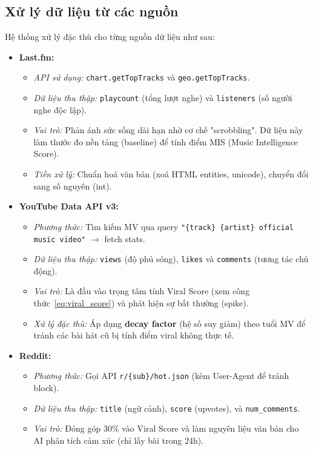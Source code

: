 \documentclass[12pt,a4paper]{report}
\begin{document}
\subsection{Xử lý dữ liệu từ các nguồn}

Hệ thống xử lý đặc thù cho từng nguồn dữ liệu như sau:

\begin{itemize}[leftmargin=*]
    \item \textbf{Last.fm:}
    \begin{itemize}
        \item \textit{API sử dụng:} \texttt{chart.getTopTracks} và \texttt{geo.getTopTracks}.
        \item \textit{Dữ liệu thu thập:} \texttt{playcount} (tổng lượt nghe) và \texttt{listeners} (số người nghe độc lập).
        \item \textit{Vai trò:} Phản ánh sức sống dài hạn nhờ cơ chế "scrobbling". Dữ liệu này làm thước đo nền tảng (baseline) để tính điểm MIS (Music Intelligence Score).
        \item \textit{Tiền xử lý:} Chuẩn hoá văn bản (xoá HTML entities, unicode), chuyển đổi sang số nguyên (int).
    \end{itemize}

    \item \textbf{YouTube Data API v3:}
    \begin{itemize}
        \item \textit{Phương thức:} Tìm kiếm MV qua query \texttt{"\{track\} \{artist\} official music video"} $\rightarrow$ fetch stats.
        \item \textit{Dữ liệu thu thập:} \texttt{views} (độ phủ sóng), \texttt{likes} và \texttt{comments} (tương tác chủ động).
        \item \textit{Vai trò:} Là đầu vào trọng tâm tính Viral Score (xem công thức~\eqref{eq:viral_score}) và phát hiện sự bất thường (spike).
        \item \textit{Xử lý đặc thù:} Áp dụng \textbf{decay factor} (hệ số suy giảm) theo tuổi MV để tránh các bài hát cũ bị tính điểm viral không thực tế.
    \end{itemize}

    \item \textbf{Reddit:}
    \begin{itemize}
        \item \textit{Phương thức:} Gọi API \texttt{r/\{sub\}/hot.json} (kèm User-Agent để tránh block).
        \item \textit{Dữ liệu thu thập:} \texttt{title} (ngữ cảnh), \texttt{score} (upvotes), và \texttt{num\_comments}.
        \item \textit{Vai trò:} Đóng góp 30\% vào Viral Score và làm nguyên liệu văn bản cho AI phân tích cảm xúc (chỉ lấy bài trong 24h).
    \end{itemize}


\end{itemize}
\end{document}

